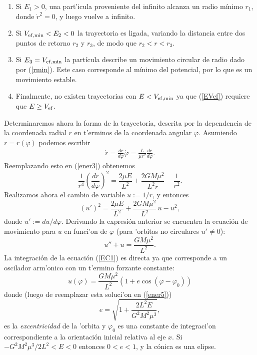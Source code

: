 \begin{enumerate}
\item Si $E_1>0$, una part'icula proveniente del infinito alcanza un radio
m\'inimo $r_1$, donde $\dot{r}^2=0$, y luego vuelve a infinito.

\item Si $V_{\rm ef, min}<E_2<0$ la trayectoria es ligada, variando la distancia entre dos puntos de retorno $r_2$ y $r_3$, de modo que $r_2<r<r_{3}$.

\item Si $E_{3}=V_{\rm ef, min}$ la part\'icula
describe un movimiento circular de radio dado por (\ref{rmin}). Este caso
corresponde al m\'inimo del potencial, por lo que es un
movimiento estable.

\item Finalmente, no existen trayectorias con $E<V_{\rm ef, min}$ ya que (\ref{EVef}) requiere que $E\ge V_{\rm ef}$.
\end{enumerate}

Determinaremos ahora la forma de la trayectoria, descrita por la dependencia de la coordenada radial $r$ en t'erminos de la coordenada angular $\varphi$. Asumiendo $r=r(\varphi)$ podemos escribir
\begin{eqnarray}
\dot{r}=\frac{dr}{d\varphi}\dot{\varphi}=\frac{L}{\mu r^2}\frac{dr}{d\varphi}.
\end{eqnarray}
Reemplazando esto en (\ref{ener3}) obtenemos
\begin{equation}
\frac{1}{r^4}\left(\frac{dr}{d\varphi}\right)^2=\frac{2\mu E}{L^2}+\frac{2GM\mu^2}{L^2r}-\frac{1}{r^2}.\label{ener4}
\end{equation}
Realizamos ahora el cambio de variable $u:=1/r$, y entonces
\begin{equation}
(u')^2=\frac{2\mu E}{L^2}+\frac{2GM\mu^2}{L^2}\,u-u^{2
},\label{ener5}
\end{equation}
donde $u':=du/d\varphi$. Derivando la expresi\'on anterior se encuentra la ecuaci\'on de
movimiento para $u$ en funci'on de $\varphi$ (para 'orbitas no circulares $u'\neq 0$):
\begin{equation}
u''+u=\frac{GM\mu^2}{L^2}.\label{EC1}
\end{equation}
La integraci\'on de la ecuaci\'on (\ref{EC1}) es directa ya que corresponde a un oscilador arm'onico con un t'ermino forzante constante:
\begin{equation}
u(\varphi)=\frac{GM\mu^2}{L^2}\left(1+e\cos
(\varphi-\varphi_0)\right)\label{CON1}
\end{equation}
donde (luego de reemplazar esta soluci'on en (\ref{ener5}))
\begin{equation}
e=\sqrt{1+\frac{2L^2E}{G^2M^2\mu^3}}, \label{ex}
\end{equation}
es la \textit{excentricidad} de la 'orbita y $\varphi_0$ es una constante de
integraci'on correspondiente a la orientaci\'on inicial relativa al eje
$x$. Si $-G^2M^2\mu^3/2L^2<E<0$ entonces $0<e<1$, y la
c\'onica es una elipse.

